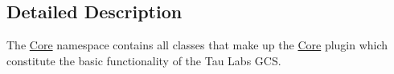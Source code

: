 \subsection{\-Detailed \-Description}
\-The \hyperlink{namespace_core}{\-Core} namespace contains all classes that make up the \hyperlink{namespace_core}{\-Core} plugin which constitute the basic functionality of the \-Tau \-Labs \-G\-C\-S. 
